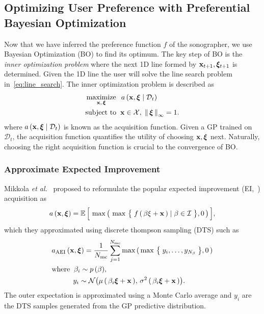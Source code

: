 \subsection{Optimizing User Preference with Preferential Bayesian Optimization}\label{section:bo}
Now that we have inferred the preference function \(f\) of the sonographer, we use Bayesian Optimization (BO) to find its optimum.
The key step of BO is the \textit{inner optimization problem} where the next 1D line formed by \(\mathbf{x}_{t+1}, \bm{\xi}_{t+1}\) is determined.
Given the 1D line the user will solve the line search problem in~\cref{eq:line_search}.
The inner optimization problem is described as
%
\begin{align}
 &\operatorname*{maximize}_{\mathbf{x},\, \bm{\xi}}\;\; a\,(\mathbf{x}, \bm{\xi} \mid \mathcal{D}_t) \\
 &\text{subject to}\;\; \mathbf{x} \in \mathcal{X},\; \left\lVert\, \bm{\xi} \,\right\rVert_{\infty} = 1.
\end{align}
where \(a\,(\mathbf{x}, \bm{\xi} \mid \mathcal{D}_t)\) is known as the acquisition function.
Given a GP trained on \(\mathcal{D}_t\), the acquisition function quantifies the utility of choosing \(\mathbf{x}, \bm{\xi}\) next.
Naturally, choosing the right acquisition function is crucial to the convergence of BO.

\subsubsection{Approximate Expected Improvement}
Mikkola \textit{et al.}~\cite{10.1145/3072959.3073598} proposed to reformulate the popular expected improvement (EI,~\cite{jones_efficient_1998}) acquisition as
\begin{align}
  a\,(\mathbf{x}, \bm{\xi})
  = \mathbb{E}\,\Big[\, \max\big(\, \max\,\big\{\; f\,(\,\beta \xi + \mathbf{x}\,) \mid \beta \in \mathcal{I} \;\big\}, 0 \,\big)\,\Big],
\end{align}
which they approximated using discrete thompson sampling (DTS) such as
\begin{align}
  &a_{\mathrm{AEI}}\,(\mathbf{x}, \bm{\xi}) 
  = \frac{1}{N_{\mathrm{mc}}} \sum_{j=1}^{N_{\mathrm{mc}}} \max\,(\, \max\,\big\{\; y_i, \ldots, y_{N_\beta} \;\big\}, 0 \,) \label{eq:aei} \\
  &\text{where} \;\;  \beta_i \sim p\,(\beta), \nonumber\\
  &\quad\qquad y_i \sim \mathcal{N}\big( \mu\,(\,\beta_i \bm{\xi} + \mathbf{x} \,),\, \sigma^2\,(\, \beta_i \bm{\xi} + \mathbf{x} \,) \big).\nonumber
\end{align}
The outer expectation is approximated using a Monte Carlo average and \(y_i\) are the DTS samples generated from the GP predictive distribution.

